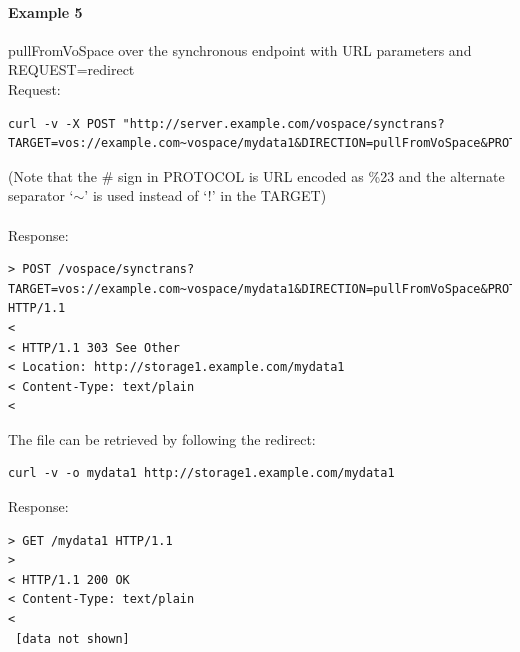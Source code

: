 \documentclass[11pt,a4paper]{ivoa}
\begin{document}
\paragraph{Example 5}
pullFromVoSpace over the synchronous endpoint with URL parameters and REQUEST=redirect
\\[5px]
\noindent
Request:
\begin{lstlisting}
curl -v -X POST "http://server.example.com/vospace/synctrans?TARGET=vos://example.com~vospace/mydata1&DIRECTION=pullFromVoSpace&PROTOCOL=ivo://ivoa.net/vospace/core%23httpget&REQUEST=redirect"
\end{lstlisting}
(Note that the \# sign in PROTOCOL is URL encoded as \%23 and the alternate separator `$\mathtt{\sim}$' is used instead of `!' in the TARGET) \\
\\
Response:
\begin{lstlisting}
> POST /vospace/synctrans?TARGET=vos://example.com~vospace/mydata1&DIRECTION=pullFromVoSpace&PROTOCOL=ivo://ivoa.net/vospace/core\%23httpget&REQUEST=redirect HTTP/1.1
<
< HTTP/1.1 303 See Other
< Location: http://storage1.example.com/mydata1
< Content-Type: text/plain
<
\end{lstlisting}
The file can be retrieved by following the redirect:
\begin{lstlisting}
curl -v -o mydata1 http://storage1.example.com/mydata1
\end{lstlisting}
Response:
\begin{lstlisting}
> GET /mydata1 HTTP/1.1
>
< HTTP/1.1 200 OK
< Content-Type: text/plain
<
 [data not shown]
\end{lstlisting}
\end{document}
